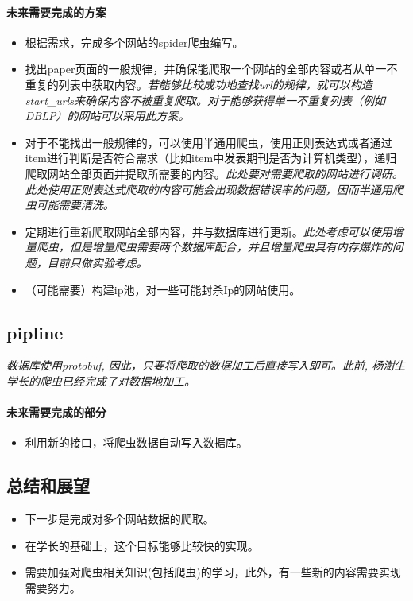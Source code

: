 \documentclass[UTF8]{ctexrep}
\begin{document}
\paragraph{未来需要完成的方案}
\begin{itemize}
    \item 根据需求，完成多个网站的spider爬虫编写。

    \item 找出paper页面的一般规律，并确保能爬取一个网站的全部内容或者从单一不重复的列表中获取内容。\textit{若能够比较成功地查找url的规律，就可以构造start\_urls来确保内容不被重复爬取。对于能够获得单一不重复列表（例如DBLP）的网站可以采用此方案。}
    
    \item 对于不能找出一般规律的，可以使用半通用爬虫，使用正则表达式或者通过item进行判断是否符合需求（比如item中发表期刊是否为计算机类型），递归爬取网站全部页面并提取所需要的内容。\textit{此处要对需要爬取的网站进行调研。}\textit{此处使用正则表达式爬取的内容可能会出现数据错误率的问题，因而半通用爬虫可能需要清洗。}
    
    \item 定期进行重新爬取网站全部内容，并与数据库进行更新。\textit{此处考虑可以使用增量爬虫，但是增量爬虫需要两个数据库配合，并且增量爬虫具有内存爆炸的问题，目前只做实验考虑。}
    
    \item （可能需要）构建ip池，对一些可能封杀Ip的网站使用。
\end{itemize}
\par

\subsection{pipline}

\textit{数据库使用protobuf, 因此，只要将爬取的数据加工后直接写入即可。此前, 杨澍生学长的爬虫已经完成了对数据地加工。}

\paragraph{未来需要完成的部分}
\begin{itemize}
\item 利用新的接口，将爬虫数据自动写入数据库。
\end{itemize}

\subsection{总结和展望}
\begin{itemize}
    \item  下一步是完成对多个网站数据的爬取。

    \item  在学长的基础上，这个目标能够比较快的实现。
    
    \item  需要加强对爬虫相关知识(包括爬虫)的学习，此外，有一些新的内容需要实现需要努力。
\end{itemize}
\end{document}
